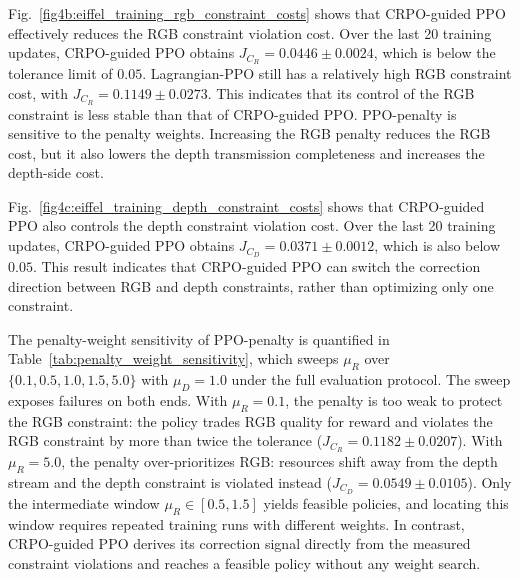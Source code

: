 \documentclass[journal]{IEEEtran}
\begin{document}
Fig.~\ref{fig4b:eiffel_training_rgb_constraint_costs} shows that CRPO-guided PPO effectively reduces the RGB constraint violation cost. Over the last 20 training updates, CRPO-guided PPO obtains $J_{C_R}=0.0446\pm0.0024$, which is below the tolerance limit of $0.05$. Lagrangian-PPO still has a relatively high RGB constraint cost, with $J_{C_R}=0.1149\pm0.0273$. This indicates that its control of the RGB constraint is less stable than that of CRPO-guided PPO. PPO-penalty is sensitive to the penalty weights. Increasing the RGB penalty reduces the RGB cost, but it also lowers the depth transmission completeness and increases the depth-side cost.

Fig.~\ref{fig4c:eiffel_training_depth_constraint_costs} shows that CRPO-guided PPO also controls the depth constraint violation cost. Over the last 20 training updates, CRPO-guided PPO obtains $J_{C_D}=0.0371\pm0.0012$, which is also below $0.05$. This result indicates that CRPO-guided PPO can switch the correction direction between RGB and depth constraints, rather than optimizing only one constraint.

The penalty-weight sensitivity of PPO-penalty is quantified in Table~\ref{tab:penalty_weight_sensitivity}, which sweeps $\mu_R$ over $\{0.1,0.5,1.0,1.5,5.0\}$ with $\mu_D=1.0$ under the full evaluation protocol. The sweep exposes failures on both ends. With $\mu_R=0.1$, the penalty is too weak to protect the RGB constraint: the policy trades RGB quality for reward and violates the RGB constraint by more than twice the tolerance ($J_{C_R}=0.1182\pm0.0207$). With $\mu_R=5.0$, the penalty over-prioritizes RGB: resources shift away from the depth stream and the depth constraint is violated instead ($J_{C_D}=0.0549\pm0.0105$). Only the intermediate window $\mu_R\in[0.5,1.5]$ yields feasible policies, and locating this window requires repeated training runs with different weights. In contrast, CRPO-guided PPO derives its correction signal directly from the measured constraint violations and reaches a feasible policy without any weight search.
\end{document}

